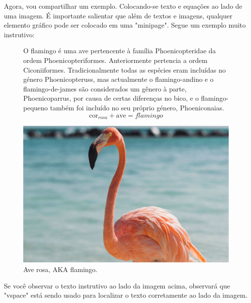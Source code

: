 Agora, vou compartilhar um exemplo. Colocando-se texto e equações ao lado de uma imagem. É importante salientar que além de textos e imagens, qualquer elemento gráfico pode ser colocado em uma "minipage". Segue um exemplo muito instrutivo:

\begin{figure}[ht]
	\begin{minipage}[b]{0.45\linewidth}
		O flamingo é uma ave pertencente à família Phoenicopteridae da ordem Phoenicopteriformes. Anteriormente pertencia a ordem Ciconiiformes. Tradicionalmente todas as espécies eram incluídas no género Phoenicopteruss, mas actualmente o flamingo-andino e o flamingo-de-james são considerados um gênero à parte, Phoenicoparrus, por causa de certas diferenças no bico, e o flamingo-pequeno também foi incluído no seu próprio género, Phoeniconaias.
		\begin{equation}
		\text{cor}_{rosa} + \text{ave} = flamingo
		\end{equation}
		\vspace{0.5cm}
	\end{minipage}
	\hspace{0.5cm}
	\begin{minipage}[b]{0.45\linewidth}
		\centering
		\includegraphics[trim = {10cm 0cm 10cm 0cm}, clip , width=\textwidth]{midia/exemplo2}
		\caption{Ave rosa, AKA flamingo.}
		\label{pika11}
	\end{minipage}
\end{figure}

Se você observar o texto instrutivo ao lado da imagem acima, observará que "vspace" está sendo usado para localizar o texto corretamente ao lado da imagem.

